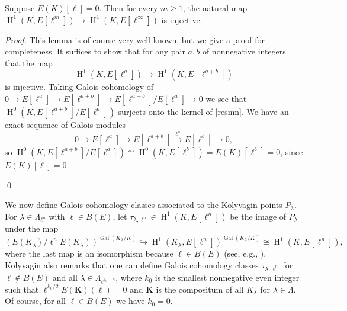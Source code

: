 \documentclass{oupau}
\DeclareMathOperator{\Gal}{Gal}
\DeclareMathOperator{\HH}{H}
\renewcommand{\H}{\HH}
\newcommand{\isom}{\cong}
\begin{document}
\begin{lemma}\label{lem:conjd}
Suppose $E(K)[\ell]=0$.  Then for every $m\geq 1$, the natural map 
$\H^1(K,E[\ell^m]) \to \H^1(K,E[\ell^\infty])$ is injective.
\end{lemma}
\begin{proof}
  This lemma is of course very well known, but we give a proof for
  completeness.  It suffices to show that for any pair $a,b$ of
  nonnegative integers that the map
\begin{equation}\label{resmn}
\H^1(K,E[\ell^a])\to \H^1(K,E[\ell^{a+b}])
\end{equation}
is injective. 
Taking Galois cohomology of
$0 \to E[\ell^a] \to E[\ell^{a+b}] \to E[\ell^{a+b}]/E[\ell^a] \to 0$
we see that $\H^0(K,E[\ell^{a+b}]/E[\ell^a])$ surjects
onto the kernel of \eqref{resmn}.
We have an exact sequence of Galois modules
$$
 0 \to E[\ell^a] \to E[\ell^{a+b}] \xrightarrow{\ell^a} E[\ell^b] \to 0,
$$
so $\H^0(K,E[\ell^{a+b}]/E[\ell^a]) \isom \H^0(K,E[\ell^b]) = E(K)[\ell^b] = 0$,
since $E(K)[\ell]=0$. 

\qed\end{proof}

We now define Galois cohomology classes associated to the Kolyvagin
points $P_{\lambda}$.  For $\lambda \in \Lambda_{\ell^n}$ with
$\ell\in B(E)$, let $\tau_{\lambda,\ell^n} \in \H^1(K, E[\ell^n])$ be
the image of $P_{\lambda}$ under the map
$$(E(K_{\lambda})/\ell^n E(K_{\lambda}))^{\Gal(K_{\lambda}/K)}
\hookrightarrow 
\H^1(K_{\lambda}, E[\ell^n])^{\Gal(K_{\lambda}/K)}
\isom 
\H^1(K, E[\ell^n]),
$$ 
where the last map is an isomorphism because $\ell \in B(E)$ 
(see, e.g., \cite[\S4]{gross:kolyvagin}).  
Kolyvagin also remarks that one can define Galois cohomology
classes $\tau_{\lambda,\ell^n}$ for $\ell\not\in B(E)$ and all
$\lambda \in \Lambda_{\ell^{k_0+n}}$, where 
$k_0$ is the smallest nonnegative even integer such that 
$\ell^{k_0/2} E(\mathbf{K})(\ell) = 0$ and $\mathbf{K}$ is the compositum of all
$K_{\lambda}$ for $\lambda \in \Lambda$.  Of course, for all $\ell\in B(E)$ we
have $k_0=0$.
\end{document}

